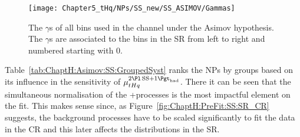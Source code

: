 \begin{figure}[h]
\centering
 \texttt{[image: Chapter5\_tHq/NPs/SS\_new/SS\_ASIMOV/Gammas]}
\caption{The $\gamma$s of all bins used in the \dilepSStau channel under the Asimov hypothesis.
The $\gamma$s are associated to the bins in the SR from left to right
and numbered starting with 0.} 
\label{fig:ChaptH:Asimov:SS:Gammas}
\end{figure}


Table~\ref{tab:ChaptH:Asimov:SS:GroupedSyst} ranks the NPs by groups based on
its influence in the sensitivity of $\mu_{\tHq}^{\dilepSStau}$. There it can be seen that the 
simultaneous normalisation of the \ttbar+\ttX processes is the most impactful element
on the fit. This makes sense since, as Figure~\ref{fig:ChaptH:PreFit:SS:SR_CR} suggests,
the background processes have to be scaled significantly to fit the data in the CR and this later
affects the distributions in the SR.


